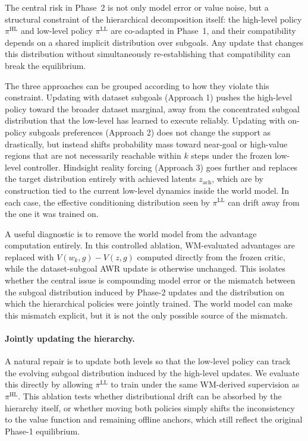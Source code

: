 The central risk in Phase~2 is not only model error or value noise, but a structural constraint of the hierarchical decomposition itself: the high-level policy $\pi^{\mathrm{HL}}$ and low-level policy $\pi^{\mathrm{LL}}$ are co-adapted in Phase~1, and their compatibility depends on a shared implicit distribution over subgoals. Any update that changes this distribution without simultaneously re-establishing that compatibility can break the equilibrium.

The three approaches can be grouped according to how they violate this constraint. Updating with dataset subgoals (Approach 1) pushes the high-level policy toward the broader dataset marginal, away from the concentrated subgoal distribution that the low-level has learned to execute reliably. Updating with on-policy subgoals preferences (Approach 2) does not change the support as drastically, but instead shifts probability mass toward near-goal or high-value regions that are not necessarily reachable within $k$ steps under the frozen low-level controller. Hindsight reality forcing (Approach 3) goes further and replaces the target distribution entirely with achieved latents $z_{\mathrm{ach}}$, which are by construction tied to the current low-level dynamics inside the world model. In each case, the effective conditioning distribution seen by $\pi^{\mathrm{LL}}$ can drift away from the one it was trained on.

A useful diagnostic is to remove the world model from the advantage computation entirely. In this controlled ablation, WM-evaluated advantages are replaced with
$V(w_k, g) - V(z, g)$ computed directly from the frozen critic, while the dataset-subgoal AWR update is otherwise unchanged. This isolates whether the central issue is compounding model error or the mismatch between the subgoal distribution induced by Phase-2 updates and the distribution on which the hierarchical policies were jointly trained. The world model can make this mismatch explicit, but it is not the only possible source of the mismatch.

\paragraph{Jointly updating the hierarchy.}
A natural repair is to update both levels so that the low-level policy can track the evolving subgoal distribution induced by the high-level updates. We evaluate this directly by allowing $\pi^{\mathrm{LL}}$ to train under the same WM-derived supervision as $\pi^{\mathrm{HL}}$. This ablation tests whether distributional drift can be absorbed by the hierarchy itself, or whether moving both policies simply shifts the inconsistency to the value function and remaining offline anchors, which still reflect the original Phase-1 equilibrium.

